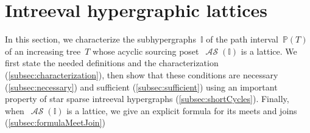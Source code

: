 \documentclass{amsart}
\theoremstyle{definition}
\newcommand{\vincent}[1]{\todo[size=\tiny,color=blue!30]{ #1 \\ \hfill --- V.}\,}
\DeclareMathOperator{\ASour}{\mathcal{AS}}  %
\newcommand{\II}{\mathbb I} %
\newcommand{\PP}{\mathbb P} %
\begin{document}


%


\section{Intreeval hypergraphic lattices}
\label{sec:intreevalHypergraphicPosets}

In this section, we characterize the subhypergraphs~$\II$ of the path interval~$\PP(T)$ of an increasing tree~$T$ whose acyclic sourcing poset~$\ASour(\II)$ is a lattice.
We first state the needed definitions and the characterization (\cref{subsec:characterization}), then show that these conditions are necessary (\cref{subsec:necessary}) and sufficient (\cref{subsec:sufficient}) using an important property of star sparse intreeval hypergraphs (\cref{subsec:shortCycles}).
Finally, when~$\ASour(\II)$ is a lattice, we give an explicit formula for its meets and joins (\cref{subsec:formulaMeetJoin})
\end{document}

